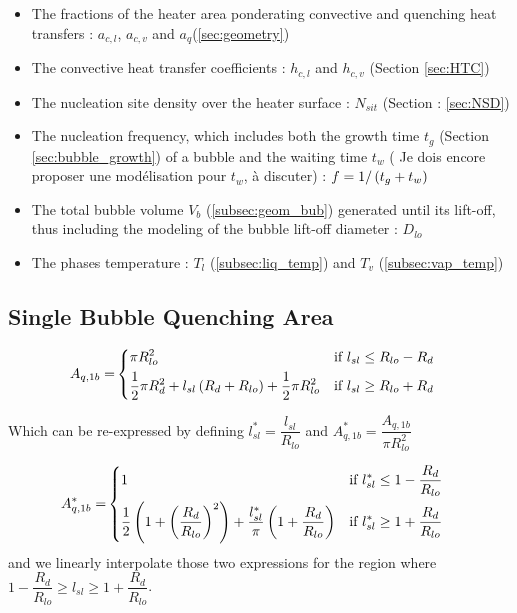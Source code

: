 \begin{itemize}
\item The fractions of the heater area ponderating convective and quenching heat transfers : $a_{c,l}$, $a_{c,v}$ and $a_{q}$(\ref{sec:geometry})
\item The convective heat transfer coefficients : $h_{c,l}$ and $h_{c,v}$ (Section \ref{sec:HTC})
\item The nucleation site density over the heater surface : $N_{sit}$ (Section : \ref{sec:NSD})
\item The nucleation frequency, which includes both the growth time $t_{g}$ (Section \ref{sec:bubble_growth}) of a bubble and the waiting time $t_{w}$ ({\color{red} Je dois encore proposer une modélisation pour $t_{w}$, à discuter}) : $f=1/\left( t_{g}+t_{w} \right)$
\item The total bubble volume $V_{b}$ (\ref{subsec:geom_bub}) generated until its lift-off, thus including the modeling of the bubble lift-off diameter : $D_{lo}$ 
\item The phases temperature : $T_{l}$ (\ref{subsec:liq_temp}) and $T_{v}$ (\ref{subsec:vap_temp})
\end{itemize}


\subsection{Single Bubble Quenching Area}

\begin{align}
A_{q,1b} = &
\begin{dcases}
\pi R_{lo}^{2} & \text{if } l_{sl}\leq R_{lo}-R_{d} \\
%
\frac{1}{2}\pi R_{d}^{2} + l_{sl}\parth{R_{d}+R_{lo}} + \frac{1}{2}\pi R_{lo}^{2} & \text{if } l_{sl} \geq R_{lo}+R_{d}
%
\end{dcases}
\end{align}

Which can be re-expressed by defining $l_{sl}^{*}=\dfrac{l_{sl}}{R_{lo}}$ and $A_{q,1b}^{*}=\dfrac{A_{q,1b}}{\pi R_{lo}^{2}}$

\begin{align}
A_{q,1b}^{*} = &
\begin{dcases}
1 & \text{if } l_{sl}^{*}\leq 1- \frac{R_{d}}{R_{lo}} \\
%
\frac{1}{2}\parth{1+\parth{\frac{R_{d}}{R_{lo}}}^{2} } + \frac{l_{sl}^{*}}{\pi}\parth{1+\frac{R_{d}}{R_{lo}}} & \text{if } l_{sl}^{*} \geq 1 + \frac{R_{d}}{R_{lo}}
\end{dcases}
\end{align}
and we linearly interpolate those two expressions for the region where $1-\dfrac{R_{d}}{R_{lo}}\geq l_{sl} \geq 1+\dfrac{R_{d}}{R_{lo}}$.


